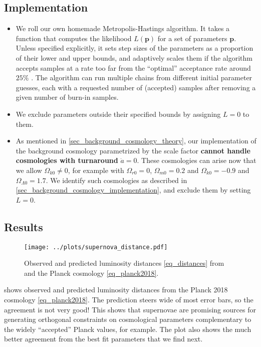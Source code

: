 \documentclass[10pt,a4paper]{article}
\begin{document}
\subsection{Implementation}

\begin{itemize}
	\item We roll our own homemade Metropolis-Hastings algorithm.
	      It takes a function that computes the likelihood $L(\mathbf{p})$ for a set of parameters $\mathbf{p}$.
	      Unless specified explicitly, it sets step sizes of the parameters as a proportion of their lower and upper bounds,
		  and adaptively scales them if the algorithm accepts samples at a rate too far from the ``optimal'' acceptance rate around $25\%$ \cite{gelmanWeakConvergenceOptimal1997}.
		  The algorithm can run multiple chains from different initial parameter guesses,
		  each with a requested number of (accepted) samples after removing a given number of burn-in samples.
	\item We exclude parameters outside their specified bounds by assigning $L=0$ to them.
	\item As mentioned in \cref{sec_background_cosmology_theory},
	      our implementation of the background cosmology parametrized by the scale factor
	      \textbf{cannot handle cosmologies with turnaround} $\dot{a} = 0$.
	      These cosmologies can arise now that we allow $\Omega_{k0} \neq 0$,
	      for example with $\Omega_{r0}=0$, $\Omega_{m0} = 0.2$ and $\Omega_{k0} = -0.9$ and $\Omega_{\Lambda0} = 1.7$.
	      We identify such cosmologies as described in \cref{sec_background_cosmology_implementation}, and exclude them by setting $L=0$.
\end{itemize}

\subsection{Results}

\begin{figure}[!b]
	\centering
	\texttt{[image: ../plots/supernova\_distance.pdf]}
	\caption{Observed and predicted luminosity distances \eqref{eq_distances} from \cite{betouleImprovedCosmologicalConstraints2014} and the Planck cosmology \eqref{eq_planck2018}.}
	\label{fig_luminosity_distances}
\end{figure}

 shows observed and predicted luminosity distances from the Planck 2018 cosmology \eqref{eq_planck2018}.
The prediction steers wide of most error bars, so the agreement is not very good!
This shows that supernovae are promising sources for generating orthogonal constraints on cosmological parameters complementary to the widely ``accepted'' Planck values, for example.
The plot also shows the much better agreement from the best fit parameters that we find next.
\end{document}
